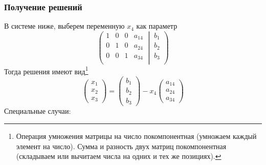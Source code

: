 \documentclass{article}
\begin{document}
\subsubsection*{Получение решений}
В системе ниже, выберем переменную $x_4$ как параметр
\[
\left(\left.
\begin{matrix}
	1& 0&0& a_{14}\\
	0& 1&0& a_{24}\\
	0& 0&1& a_{34}\\
\end{matrix}
\:\right|\:
\begin{matrix}
	b_1\\
	b_2\\
	b_3\\
\end{matrix}
\right)
\]
Тогда решения имеют вид\footnote{Операция умножения матрицы на число покомпонентная (умножаем каждый элемент на число). Сумма и разность двух матриц покомпонентная (складываем или вычитаем числа на одних и тех же позициях).}
\[
\begin{pmatrix}
	x_1\\
	x_2\\
	x_3
\end{pmatrix}
=
\begin{pmatrix}
	b_1\\
	b_2\\
	b_3
\end{pmatrix}
-
x_4
\begin{pmatrix}
	a_{14}\\
	a_{24}\\
	a_{34}
\end{pmatrix}
\]
Специальные случаи:
\end{document}
